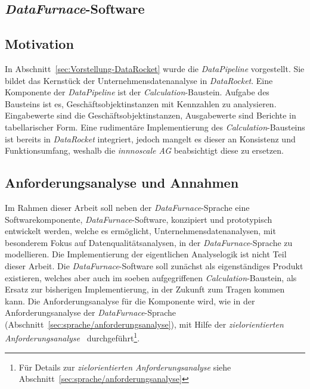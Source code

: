 \documentclass[
  language=german, %
  type=bachelor%
]{isthesis}
\begin{document}
\begin{content}
  \chapter{\textit{DataFurnace}-Software}

  \section{Motivation}
  In Abschnitt~\ref{sec:Vorstellung-DataRocket} wurde die \textit{DataPipeline}
  vorgestellt. Sie bildet das Kernstück der Unternehmensdatenanalyse in
  \textit{DataRocket}. Eine Komponente der \textit{DataPipeline} ist der
  \textit{Calculation}-Baustein.  Aufgabe des Bausteins ist es,
  Geschäftsobjektinstanzen mit Kennzahlen zu analysieren. Eingabewerte sind die
  Geschäftsobjektinstanzen, Ausgabewerte sind Berichte in tabellarischer Form.
  Eine rudimentäre Implementierung des \textit{Calculation}-Bausteins ist
  bereits in \textit{DataRocket} integriert, jedoch mangelt es dieser an
  Konsistenz und Funktionsumfang, weshalb die \textit{innnoscale AG}
  beabsichtigt diese zu ersetzen.

  \section{Anforderungsanalyse und Annahmen}
	Im Rahmen dieser Arbeit soll neben der \textit{DataFurnace}-Sprache eine
	Softwarekomponente, \textit{DataFurnace}-Software, konzipiert und
	prototypisch entwickelt werden, welche es ermöglicht,
	Unternehmensdatenanalysen, mit besonderem Fokus auf Datenqualitätsanalysen,
	in der \textit{DataFurnace}-Sprache zu modellieren. Die Implementierung der
	eigentlichen Analyselogik ist nicht Teil dieser Arbeit.  Die
	\textit{DataFurnace}-Software soll zunächst als eigenständiges Produkt
	existieren, welches aber auch im soeben aufgegriffenen
	\textit{Calculation}-Baustein, als Ersatz zur bisherigen Implementierung, in
	der Zukunft zum Tragen kommen kann. Die Anforderungsanalyse für die
	Komponente wird, wie in der Anforderungsanalyse der
	\textit{DataFurnace}-Sprache
	(Abschnitt~\ref{sec:sprache/anforderungsanalyse}), mit Hilfe der
	\textit{zielorientierten Anforderungsanalyse}~\cite[][]{van2001goal}
	durchgeführt\footnote{Für Details zur \textit{zielorientierten
	Anforderungsanalyse} siehe Abschnitt~\ref{sec:sprache/anforderungsanalyse}}. 


\end{content}
\end{document}
